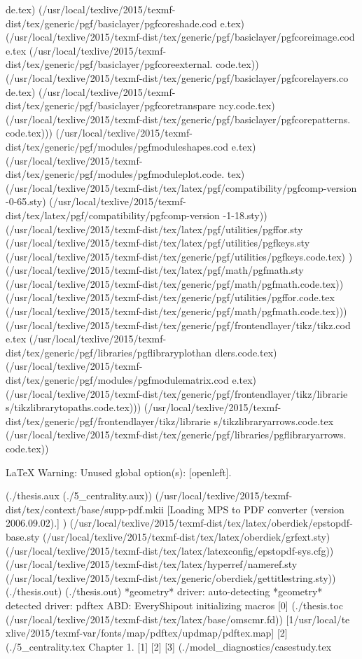 de.tex)
(/usr/local/texlive/2015/texmf-dist/tex/generic/pgf/basiclayer/pgfcoreshade.cod
e.tex)
(/usr/local/texlive/2015/texmf-dist/tex/generic/pgf/basiclayer/pgfcoreimage.cod
e.tex
(/usr/local/texlive/2015/texmf-dist/tex/generic/pgf/basiclayer/pgfcoreexternal.
code.tex))
(/usr/local/texlive/2015/texmf-dist/tex/generic/pgf/basiclayer/pgfcorelayers.co
de.tex)
(/usr/local/texlive/2015/texmf-dist/tex/generic/pgf/basiclayer/pgfcoretranspare
ncy.code.tex)
(/usr/local/texlive/2015/texmf-dist/tex/generic/pgf/basiclayer/pgfcorepatterns.
code.tex)))
(/usr/local/texlive/2015/texmf-dist/tex/generic/pgf/modules/pgfmoduleshapes.cod
e.tex)
(/usr/local/texlive/2015/texmf-dist/tex/generic/pgf/modules/pgfmoduleplot.code.
tex)
(/usr/local/texlive/2015/texmf-dist/tex/latex/pgf/compatibility/pgfcomp-version
-0-65.sty)
(/usr/local/texlive/2015/texmf-dist/tex/latex/pgf/compatibility/pgfcomp-version
-1-18.sty))
(/usr/local/texlive/2015/texmf-dist/tex/latex/pgf/utilities/pgffor.sty
(/usr/local/texlive/2015/texmf-dist/tex/latex/pgf/utilities/pgfkeys.sty
(/usr/local/texlive/2015/texmf-dist/tex/generic/pgf/utilities/pgfkeys.code.tex)
) (/usr/local/texlive/2015/texmf-dist/tex/latex/pgf/math/pgfmath.sty
(/usr/local/texlive/2015/texmf-dist/tex/generic/pgf/math/pgfmath.code.tex))
(/usr/local/texlive/2015/texmf-dist/tex/generic/pgf/utilities/pgffor.code.tex
(/usr/local/texlive/2015/texmf-dist/tex/generic/pgf/math/pgfmath.code.tex)))
(/usr/local/texlive/2015/texmf-dist/tex/generic/pgf/frontendlayer/tikz/tikz.cod
e.tex
(/usr/local/texlive/2015/texmf-dist/tex/generic/pgf/libraries/pgflibraryplothan
dlers.code.tex)
(/usr/local/texlive/2015/texmf-dist/tex/generic/pgf/modules/pgfmodulematrix.cod
e.tex)
(/usr/local/texlive/2015/texmf-dist/tex/generic/pgf/frontendlayer/tikz/librarie
s/tikzlibrarytopaths.code.tex)))
(/usr/local/texlive/2015/texmf-dist/tex/generic/pgf/frontendlayer/tikz/librarie
s/tikzlibraryarrows.code.tex
(/usr/local/texlive/2015/texmf-dist/tex/generic/pgf/libraries/pgflibraryarrows.
code.tex))

LaTeX Warning: Unused global option(s):
    [openleft].

(./thesis.aux (./5_centrality.aux))
(/usr/local/texlive/2015/texmf-dist/tex/context/base/supp-pdf.mkii
[Loading MPS to PDF converter (version 2006.09.02).]
) (/usr/local/texlive/2015/texmf-dist/tex/latex/oberdiek/epstopdf-base.sty
(/usr/local/texlive/2015/texmf-dist/tex/latex/oberdiek/grfext.sty)
(/usr/local/texlive/2015/texmf-dist/tex/latex/latexconfig/epstopdf-sys.cfg))
(/usr/local/texlive/2015/texmf-dist/tex/latex/hyperref/nameref.sty
(/usr/local/texlive/2015/texmf-dist/tex/generic/oberdiek/gettitlestring.sty))
(./thesis.out) (./thesis.out)
*geometry* driver: auto-detecting
*geometry* detected driver: pdftex
ABD: EveryShipout initializing macros [0] (./thesis.toc
(/usr/local/texlive/2015/texmf-dist/tex/latex/base/omscmr.fd)) [1{/usr/local/te
xlive/2015/texmf-var/fonts/map/pdftex/updmap/pdftex.map}] [2]
(./5_centrality.tex
Chapter 1.
[1] [2] [3] (./model_diagnostics/casestudy.tex

